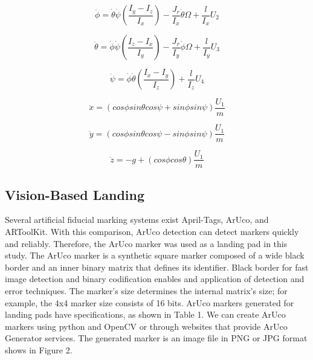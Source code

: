 \documentclass[a4paper]{jpconf}
\begin{document}
\begin{equation}
    \ddot{\phi}=\dot{\theta}\dot{\psi}\left ( \frac{I_{y}-I_{z}}{I_{x}} \right )-\frac{J_{r}}{I_{x}}\dot{\theta}\Omega+\frac{l}{I_{x}}U_{2}
\end{equation}

\begin{equation}
    \ddot{\theta}=\dot{\phi}\dot{\psi}\left ( \frac{I_{z}-I_{x}}{I_{y}} \right )-\frac{J_{r}}{I_{y}}\dot{\phi}\Omega+\frac{l}{I_{y}}U_{3}
\end{equation}

\begin{equation}
    \ddot{\psi}=\dot{\phi}\dot{\theta}\left ( \frac{I_{x}-I_{y}}{I_{z}} \right )+\frac{l}{I_{z}}U_{4}
\end{equation}

\begin{equation}
    \ddot{x}=(cos\phi sin\theta cos\psi + sin\phi sin\psi)\frac{U_{1}}{m}
\end{equation}

\begin{equation}
    \ddot{y}=(cos\phi sin\theta cos\psi - sin\phi sin\psi)\frac{U_{1}}{m}
\end{equation}

\begin{equation}
    \ddot{z}=-g+(cos\phi cos\theta)\frac{U_{1}}{m}
\end{equation}

\subsection{Vision-Based Landing}
Several artificial fiducial marking systems exist April-Tags, ArUco, and ARToolKit\cite{ref10}. With this comparison, ArUco detection can detect markers quickly and reliably\cite{ref11}. Therefore, the ArUco marker was used as a landing pad in this study. The ArUco marker is a synthetic square marker composed of a wide black border and an inner binary matrix that defines its identifier. Black border for fast image detection and binary codification enables and application of detection and error techniques. The marker's size determines the internal matrix's size; for example, the 4x4 marker size consists of 16 bits. ArUco markers generated for landing pads have specifications, as shown in Table 1. We can create ArUco markers using python and OpenCV or through websites that provide ArUco Generator services. The generated marker is an image file in PNG or JPG format shows in Figure 2.
\end{document}
